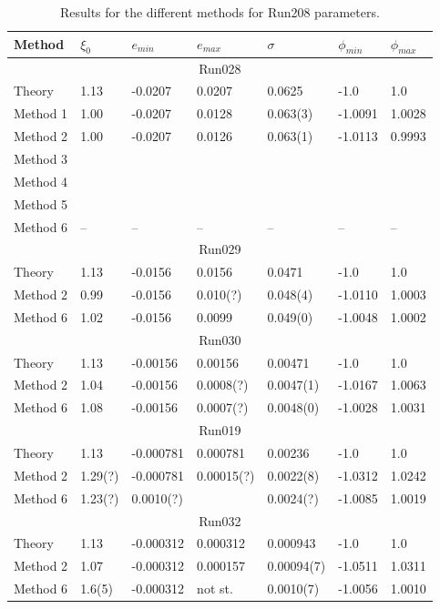 \begin{table}
\begin{tabular}{lllllll}
\hline
Method & $\xi_0$ & $e_{min}$ & $e_{max}$ & $\sigma$  & $\phi_{min}$
& $\phi_{max}$\\
\hline
\multicolumn{7}{c}{Run028}\\
\hline
Theory   & 1.13 & -0.0207 &  0.0207 & 0.0625 & -1.0 & 1.0 \\
Method 1 & 1.00 & -0.0207 & 0.0128 & 0.063(3) & -1.0091 & 1.0028 \\
Method 2 & 1.00 & -0.0207 & 0.0126 & 0.063(1) & -1.0113 & 0.9993 \\
Method 3 & && & & & \\
Method 4 & && & & & \\
Method 5 & && & & & \\
Method 6 & --& --& --& --& --& --\\
\hline
\multicolumn{7}{c}{Run029}\\
\hline
Theory & 1.13 & -0.0156 & 0.0156 & 0.0471  & -1.0 & 1.0\\
Method 2 & 0.99 & -0.0156 & 0.010(?) & 0.048(4) & -1.0110 & 1.0003\\ 
Method 6 & 1.02 & -0.0156 & 0.0099 & 0.049(0) & -1.0048 & 1.0002\\
\hline
\multicolumn{7}{c}{Run030}\\
\hline
Theory & 1.13 & -0.00156 & 0.00156 & 0.00471 & -1.0 & 1.0\\
Method 2 & 1.04 & -0.00156 & 0.0008(?) & 0.0047(1) & -1.0167 & 1.0063\\
Method 6 & 1.08 & -0.00156 & 0.0007(?) & 0.0048(0) & -1.0028 & 1.0031\\
\hline
\multicolumn{7}{c}{Run019}\\
\hline
Theory & 1.13 & -0.000781 & 0.000781 & 0.00236 & -1.0 & 1.0\\
Method 2 & 1.29(?) & -0.000781 & 0.00015(?) & 0.0022(8) & -1.0312 & 1.0242\\
Method 6 & 1.23(?) & 0.0010(?) &&  0.0024(?) & -1.0085 & 1.0019\\
\hline 
\multicolumn{7}{c}{Run032}\\
\hline
Theory   & 1.13 &  -0.000312 & 0.000312 & 0.000943  & -1.0 &1.0\\
Method 2 & 1.07  & -0.000312& 0.000157 & 0.00094(7) & -1.0511 & 1.0311\\
Method 6 & 1.6(5)& -0.000312 & not st. & 0.0010(7) &-1.0056 & 1.0010\\
\hline
\end{tabular}
\caption{Results for the different methods for Run208 parameters.}
\end{table}

